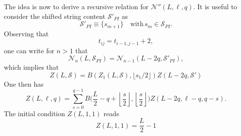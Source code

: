 \documentclass[11pt]{iopart}
\begin{document}
The idea is now to derive a recursive relation for ${\mathcal N}''(L,\ell,q)$. 
It is useful to consider the shifted string content ${\mathcal S}'_{PI}$ as  
%
\begin{equation}
{\mathcal S}'_{PI}\equiv \{s_{m+1}\}\quad\textrm{with}\, s_m\in{\mathcal S}_{PI}.
\end{equation}
%
Observing that 
%
\begin{equation}
t_{ij}=t_{i-1,j-1}+2,
\end{equation}
%
one can write for $n>1$ that 
%
\begin{equation}
{\mathcal N}_n(L,{\mathcal S}_{PI})={\mathcal N}_{n-1}(L-2q,{\mathcal S}'_{PI}),
\end{equation}
%
which implies that 
%
\begin{equation}
Z(L,{\mathcal S})=B(Z_1(L,{\mathcal S}),\lfloor s_1/2\rfloor)Z(L-2q,{\mathcal S}')
\end{equation}
%
One then has 
%
\begin{equation}
Z(L,\ell,q)=\sum_{s=0}^{q-1}B\Big(\frac{L}{2}-q+\left\lfloor\frac{s}{2}\right\rfloor,
\left\lfloor\frac{s}{2}\right\rfloor\Big)Z\left(L-2q,\ell-q,
q-s\right).
\end{equation}
%
The initial condition $Z(L,1,1)$ reads 
%
\begin{equation}
Z(L,1,1)=\frac{L}{2}-1
\end{equation}
%
\end{document}
